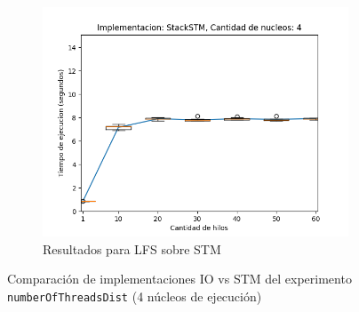 \begin{appendices}
\begin{figure}[t]
\begin{subfigure}[b]{0.49\textwidth}
        \includegraphics[width=\textwidth]{images/numberOfThreadsDist/plots/expStackSTM-4}
        \caption{Resultados para LFS sobre STM}
        \label{subfig:numberOfThreadsDist-stackstm-4}
    \end{subfigure}
    \caption{Comparación de implementaciones IO vs STM del experimento \texttt{numberOfThreadsDist} (4 núcleos de ejecución)}
    \label{fig:numberOfThreadsDist-boxplots-4}
\end{figure}

\end{appendices}